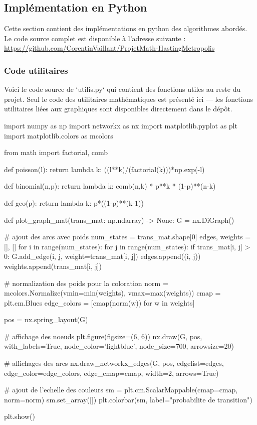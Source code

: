 \documentclass{article}
\begin{document}
\subsection{Implémentation en Python}

Cette section contient des implémentations en python des algorithmes abordés. 
Le code source complet est disponible à l'adresse suivante : \url{https://github.com/CorentinVaillant/ProjetMath-HastingMetropolis}

\subsubsection{Code utilitaires}

Voici le code source de `utilis.py` qui contient des fonctions utiles au reste du projet. Seul le code des utilitaires mathématiques est présenté ici — les fonctions utilitaires liées aux graphiques sont disponibles directement dans le dépôt.
\begin{python}
    import numpy as np
    import networkx as nx
    import matplotlib.pyplot as plt
    import matplotlib.colors as mcolors
    
    
    from math import factorial, comb
    
    def poisson(l):
        return lambda k: ((l**k)/(factorial(k)))*np.exp(-l)
    
    def binomial(n,p):
        return lambda k: comb(n,k) * p**k * (1-p)**(n-k)
    
    def geo(p):
        return lambda k: p*((1-p)**(k-1))
    
    
    def plot_graph_mat(trans_mat: np.ndarray) -> None:
        G = nx.DiGraph()
    
        # ajout des arcs avec poids
        num_states = trans_mat.shape[0]
        edges, weights = [], [] 
        for i in range(num_states):
            for j in range(num_states):
                if trans_mat[i, j] > 0:
                    G.add_edge(i, j, weight=trans_mat[i, j])
                    edges.append((i, j))
                    weights.append(trans_mat[i, j])
    
        # normalization des poids pour la coloration
        norm = mcolors.Normalize(vmin=min(weights), vmax=max(weights))
        cmap = plt.cm.Blues  
        edge_colors = [cmap(norm(w)) for w in weights]
    
        pos = nx.spring_layout(G)
    
        # affichage des noeuds
        plt.figure(figsize=(6, 6))
        nx.draw(G, pos, with_labels=True, node_color='lightblue', node_size=700, arrowsize=20)
    
        # affichages des arcs
        nx.draw_networkx_edges(G, pos, edgelist=edges, edge_color=edge_colors, edge_cmap=cmap, width=2, arrows=True)
    
        # ajout de l'echelle des couleurs
        sm = plt.cm.ScalarMappable(cmap=cmap, norm=norm)
        sm.set_array([])
        plt.colorbar(sm, label="probabilite de transition") 
    
        plt.show()    
\end{python}
\newpage
\end{document}
